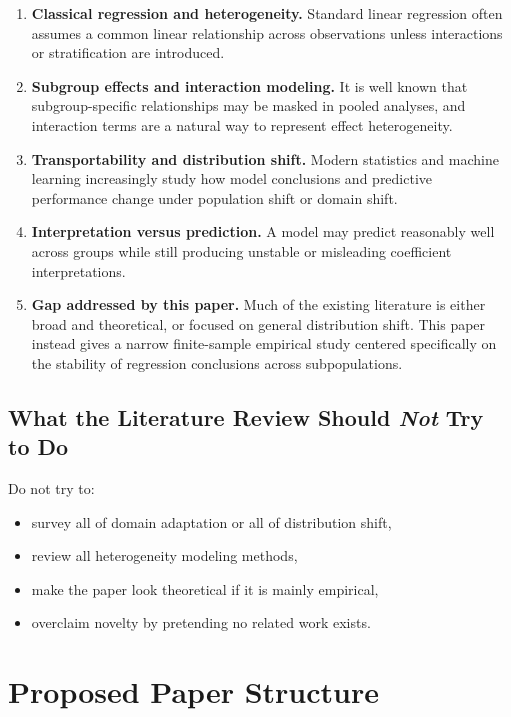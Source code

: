 \documentclass[11pt]{article}
\begin{document}
\begin{enumerate}[label=(\arabic*)]
    \item \textbf{Classical regression and heterogeneity.}  
    Standard linear regression often assumes a common linear relationship across observations unless interactions or stratification are introduced.

    \item \textbf{Subgroup effects and interaction modeling.}  
    It is well known that subgroup-specific relationships may be masked in pooled analyses, and interaction terms are a natural way to represent effect heterogeneity.

    \item \textbf{Transportability and distribution shift.}  
    Modern statistics and machine learning increasingly study how model conclusions and predictive performance change under population shift or domain shift.

    \item \textbf{Interpretation versus prediction.}  
    A model may predict reasonably well across groups while still producing unstable or misleading coefficient interpretations.

    \item \textbf{Gap addressed by this paper.}  
    Much of the existing literature is either broad and theoretical, or focused on general distribution shift. This paper instead gives a narrow finite-sample empirical study centered specifically on the stability of regression conclusions across subpopulations.
\end{enumerate}

\subsection{What the Literature Review Should \emph{Not} Try to Do}
Do not try to:
\begin{itemize}
    \item survey all of domain adaptation or all of distribution shift,
    \item review all heterogeneity modeling methods,
    \item make the paper look theoretical if it is mainly empirical,
    \item overclaim novelty by pretending no related work exists.
\end{itemize}

\section{Proposed Paper Structure}
\end{document}

